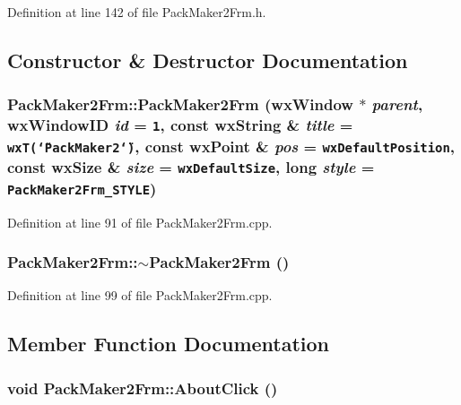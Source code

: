 Definition at line 142 of file Pack\-Maker2Frm.h.

\subsection{Constructor \& Destructor Documentation}
\subsubsection{\setlength{\rightskip}{0pt plus 5cm}Pack\-Maker2Frm::Pack\-Maker2Frm (wx\-Window $\ast$ {\em parent}, wx\-Window\-ID {\em id} = {\tt 1}, const wx\-String \& {\em title} = {\tt wxT(\char`\"{}PackMaker2\char`\"{})}, const wx\-Point \& {\em pos} = {\tt wxDefaultPosition}, const wx\-Size \& {\em size} = {\tt wxDefaultSize}, long {\em style} = {\tt PackMaker2Frm\_\-STYLE})}\label{class_pack_maker2_frm_ba840392c1143f1a0b7da327d5c06ded}




Definition at line 91 of file Pack\-Maker2Frm.cpp.
\subsubsection{\setlength{\rightskip}{0pt plus 5cm}Pack\-Maker2Frm::$\sim$Pack\-Maker2Frm ()\hspace{0.3cm}{\tt  [virtual]}}\label{class_pack_maker2_frm_6bea3a704a6be122adcaa20e6dea721e}




Definition at line 99 of file Pack\-Maker2Frm.cpp.

\subsection{Member Function Documentation}
\subsubsection{\setlength{\rightskip}{0pt plus 5cm}void Pack\-Maker2Frm::About\-Click ()}\label{class_pack_maker2_frm_67cc1f708f862076b20c7c119424cef2}




